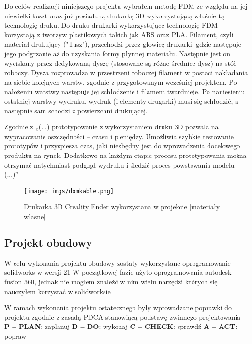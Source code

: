 \documentclass[a4paper,12pt,reqno]{article}
\begin{document}
Do celów realizacji niniejszego projektu wybrałem metodę FDM ze względu \textcolor{to_change}{na jej niewielki koszt oraz} już posiadaną drukarkę 3D wykorzystującą właśnie tą technologię druku. 
Do druku drukarki wykorzystujące technologię FDM korzystają z tworzyw plastikowych takich jak ABS oraz PLA.
Filament, czyli \textcolor{edited}{materiał drukujący} \textcolor{new}{("Tusz")}, przechodzi przez głowicę drukarki, gdzie następuje jego podgrzanie aż do uzyskania formy płynnej materiału. 
Następnie jest on wyciskany przez dedykowaną dyszę (stosowane są różne średnice dysz) na stół roboczy. 
Dysza rozprowadza w przestrzeni roboczej filament w postaci nakładania na siebie kolejnych warstw, zgodnie z przygotowanym wcześniej projektem. 
Po nałożeniu warstwy następuje jej schłodzenie i filament twardnieje. 
Po naniesieniu ostatniej warstwy \textcolor{new}{wydruku}, wydruk \textcolor{new}{(i elementy drugarki) musi się schłodzić, a następnie sam schodzi z powierzchni drukującej}.

Zgodnie z „(...) prototypowanie z wykorzystaniem druku 3D pozwala na wypracowanie oszczędności – czasu i pieniędzy. Umożliwia szybkie testowanie prototypów i przyspiesza czas, jaki niezbędny jest do wprowadzenia docelowego produktu na rynek. Dodatkowo na każdym etapie procesu prototypowania można otrzymać natychmiast podgląd wydruku i śledzić proces powstawania modelu (...)” \cite{prototyp3dzalety}

\begin{figure}[!ht]%
\centering
\texttt{[image: imgs/domkable.png]}
\caption{Drukarka 3D Creality Ender wykorzystana w projekcie [materiały własne] \label{ender3d}}
\quad
\end{figure}

\subsection{Projekt obudowy}
W celu wykonania projektu obudowy zostały wykorzystane oprogramowanie solidworks	 w wersji 21
W początkowej fazie użyto oprogramowania autodesk fusion 360, jednak \textcolor{new}{nie mogłem znaleźć w nim wielu narzędzi których się nauczyłem korzystać w solidworksie}

W ramach wykonania projektu ostatecznego były wprowadzane poprawki do projektu zgodnie z zasadą PDCA stanowiącą podstawę zwinnego projektowania \newline
\textbf{P – PLAN}: zaplanuj \newline
\textbf{D – DO}: wykonaj \newline
\textbf{C – CHECK}: sprawdź \newline
\textbf{A – ACT}: popraw
\end{document}
